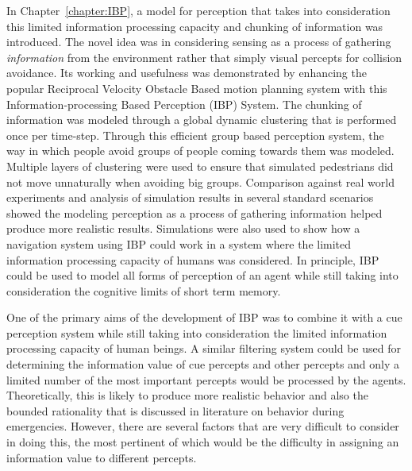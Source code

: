 In Chapter~\ref{chapter:IBP}, a model for perception that takes into consideration this limited information processing capacity and chunking of information was introduced. The novel idea was in considering sensing as a process of gathering \emph{information} from the environment rather that simply visual percepts for collision avoidance. Its working and usefulness was demonstrated by enhancing the popular Reciprocal Velocity Obstacle Based motion planning system with this Information-processing Based Perception (IBP) System. The chunking of information was modeled through a global dynamic clustering that is performed once per time-step. Through this efficient group based perception system, the way in which people avoid groups of people coming towards them was modeled. Multiple layers of clustering were used to ensure that simulated pedestrians did not move unnaturally when avoiding big groups. Comparison against real world experiments and analysis of simulation results in several standard scenarios showed the modeling perception as a process of gathering information helped produce more realistic results. Simulations were also used to show how a navigation system using IBP could work in a system where the limited information processing capacity of humans was considered. In principle, IBP could be used to model all forms of perception of an agent while still taking into consideration the cognitive limits of short term memory.




One of the primary aims of the development of IBP was to combine it with a cue perception system while still taking into consideration the limited information processing capacity of human beings. A similar filtering system could be used for determining the information value of cue percepts and other percepts and only a limited number of the most important percepts would be processed by the agents. Theoretically, this is likely to produce more realistic behavior and also the bounded rationality that is discussed in literature on behavior during emergencies. However, there are several factors that are very difficult to consider in doing this, the most pertinent of which would be the difficulty in assigning an information value to different percepts.


